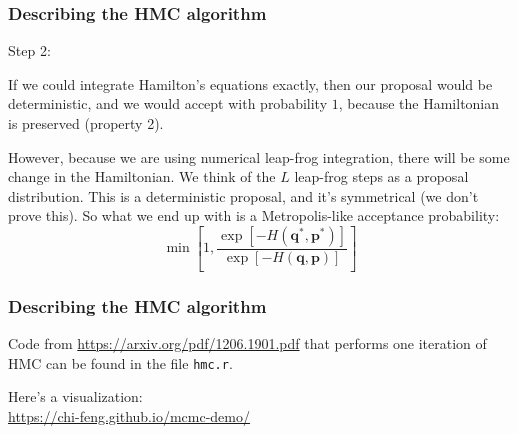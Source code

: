 \documentclass{beamer}
\begin{document}
\begin{frame}
\frametitle{Describing the HMC algorithm}

Step 2: 
\newline

If we could integrate Hamilton's equations exactly, then our proposal would be deterministic, and we would accept with probability $1$, because the Hamiltonian is preserved (property 2). 
\newline

However, because we are using numerical leap-frog integration, there will be some change in the Hamiltonian. We think of the $L$ leap-frog steps as a proposal distribution. This is a deterministic proposal, and it's symmetrical (we don't prove this). So what we end up with is a Metropolis-like acceptance probability:
$$
\min\left[1, \frac{\exp\left[ -H(\mathbf{q}^*,\mathbf{p}^*) \right]}{\exp\left[ -H(\mathbf{q},\mathbf{p}) \right] } \right]
$$



\end{frame}

\begin{frame}[fragile]
\frametitle{Describing the HMC algorithm}

Code from \url{https://arxiv.org/pdf/1206.1901.pdf} that performs one iteration of HMC can be found in the file \verb|hmc.r|.
\newline

Here's a visualization:\\
\url{https://chi-feng.github.io/mcmc-demo/}


\end{frame}
\end{document}
